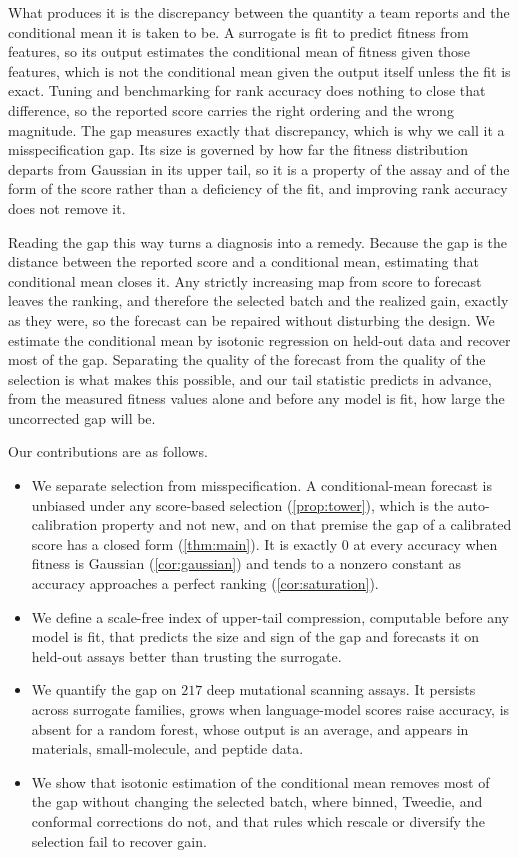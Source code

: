 \documentclass{article}
\theoremstyle{plain}
\theoremstyle{definition}
\begin{document}
What produces it is the discrepancy between the quantity a team reports and the
conditional mean it is taken to be. A surrogate is fit to predict
fitness from features, so its output estimates the conditional mean of fitness given
those features, which is not the conditional mean given the output itself unless the
fit is exact. Tuning and benchmarking for rank accuracy does nothing to close that
difference, so the reported score carries the right ordering and the wrong magnitude. The gap measures exactly that discrepancy, which is why we
call it a misspecification gap. Its size is governed by how far the fitness
distribution departs from Gaussian in its upper tail, so it is a property of the assay
and of the form of the score rather than a deficiency of the fit, and improving rank
accuracy does not remove it.

Reading the gap this way turns a diagnosis into a remedy. Because the gap is the
distance between the reported score and a conditional mean, estimating that conditional
mean closes it. Any strictly increasing map from score to forecast leaves the ranking,
and therefore the selected batch and the realized gain, exactly as they were, so the
forecast can be repaired without disturbing the design. We estimate the conditional
mean by isotonic regression on held-out data and recover most of the gap. Separating
the quality of the forecast from the quality of the selection is what makes this
possible, and our tail statistic predicts in advance, from the measured fitness values
alone and before any model is fit, how large the uncorrected gap will be.

Our contributions are as follows.

\begin{itemize}
\item We separate selection from misspecification. A conditional-mean forecast is
unbiased under any score-based selection (\cref{prop:tower}), which is the
auto-calibration property and not new, and on that premise the gap of a calibrated
score has a closed form (\cref{thm:main}). It is exactly $0$ at every accuracy when fitness is Gaussian
(\cref{cor:gaussian}) and tends to a nonzero constant as accuracy approaches a perfect
ranking (\cref{cor:saturation}).
\item We define a scale-free index of upper-tail compression, computable before any
model is fit, that predicts the size and sign of the gap and forecasts it on held-out
assays better than trusting the surrogate.
\item We quantify the gap on $217$ deep mutational scanning assays. It persists across
surrogate families, grows when language-model scores raise accuracy, is absent for a
random forest, whose output is an average, and appears in materials, small-molecule,
and peptide data.
\item We show that isotonic estimation of the conditional mean removes most of the gap
without changing the selected batch, where binned, Tweedie, and conformal corrections
do not, and that rules which rescale or diversify the selection fail to recover gain.
\end{itemize}
\end{document}
